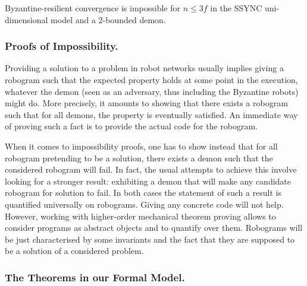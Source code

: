 \documentclass[11pt,a4]{llncs}
\begin{document}
\begin{theorem}\label{thm:tiers}
  Byzantine-resilient convergence is impossible for  $n \leq 3f$ in the
  SSYNC
  uni-dimensional model and a \mbox{2-bounded}
  demon.
\end{theorem}

\subsubsection*{Proofs of Impossibility.}\label{sec:impossibility}

Providing a solution to a problem in robot networks usually implies giving
a robogram such that the expected property holds at some point in
the execution, whatever the demon (seen as an adversary, thus including
the Byzantine robots) might do. More precisely, it amounts to showing
that there exists a robogram such that for all demons, the property is
eventually satisfied. An immediate way of proving such a
fact is to provide the actual code for the robogram.

When it comes to impossibility proofs, one has to show instead that
for all robogram pretending to be a solution, there exists a demon
such that the considered robogram will fail. In fact, the usual
attempts to achieve this involve looking for a stronger result:
exhibiting a demon that will make any candidate robogram for solution
to fail. In both cases the statement of such a result is quantified
universally on robograms. Giving any concrete code will not
help. However, working with higher-order mechanical theorem proving
allows to consider programs as abstract objects and to quantify over
them. Robograms will be just characterised by some invariants and the
fact that they are supposed to be a solution of a considered problem.


\subsubsection*{The Theorems in our Formal Model.}\label{sec:formal_theorems}
\end{document}

